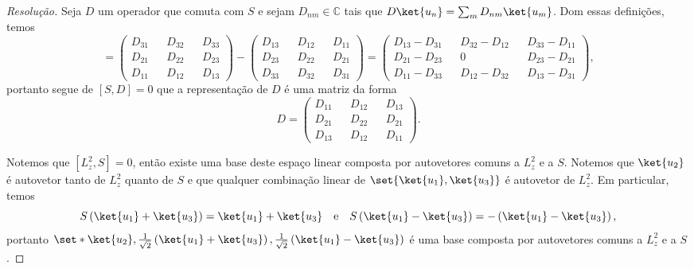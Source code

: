 \begin{proof}[Resolução]
    Seja \(D\) um operador que comuta com \(S\) e sejam \(D_{nm} \in \mathbb{C}\) tais que \(D\ket{u_n} = \sum_{m} D_{nm}\ket{u_m}\). Dom essas definições, temos
    \begin{equation*}
        [S, D] = \begin{pmatrix}
            D_{31} && D_{32} && D_{33}\\
            D_{21} && D_{22} && D_{23}\\
            D_{11} && D_{12} && D_{13}
        \end{pmatrix} - \begin{pmatrix}
            D_{13} && D_{12} && D_{11}\\
            D_{23} && D_{22} && D_{21}\\
            D_{33} && D_{32} && D_{31}
        \end{pmatrix} =
        \begin{pmatrix}
            D_{13} - D_{31} && D_{32} - D_{12} && D_{33} - D_{11}\\
            D_{21} - D_{23} && 0 && D_{23} - D_{21}\\
            D_{11} - D_{33} && D_{12} - D_{32} && D_{13} - D_{31}
        \end{pmatrix},
    \end{equation*}
    portanto segue de \([S,D] = 0\) que a representação de \(D\) é uma matriz da forma
    \begin{equation*}
        D =
        \begin{pmatrix}
            D_{11} && D_{12} && D_{13}\\
            D_{21} && D_{22} && D_{21}\\
            D_{13} && D_{12} && D_{11}
        \end{pmatrix}.
    \end{equation*}

    Notemos que \([L_z^2, S] = 0\), então existe uma base deste espaço linear composta por autovetores comuns a \(L_z^2\) e a \(S\). Notemos que \(\ket{u_2}\) é autovetor tanto de \(L_z^2\) quanto de \(S\) e que qualquer combinação linear de \(\set{\ket{u_1}, \ket{u_3}}\) é autovetor de \(L_z^2\). Em particular, temos
    \begin{equation*}
        S\left(\ket{u_1} + \ket{u_3}\right) = \ket{u_1} + \ket{u_3}
        \quad\text{e}\quad
        S\left(\ket{u_1} - \ket{u_3}\right) = -\left(\ket{u_1} - \ket{u_3}\right),
    \end{equation*}
    portanto \(\set*{\ket{u_2}, \frac{1}{\sqrt{2}}\left(\ket{u_1} + \ket{u_3}\right), \frac{1}{\sqrt{2}}\left(\ket{u_1} - \ket{u_3}\right)}\) é uma base composta por autovetores comuns a \(L_z^2\) e a \(S\).
\end{proof}
